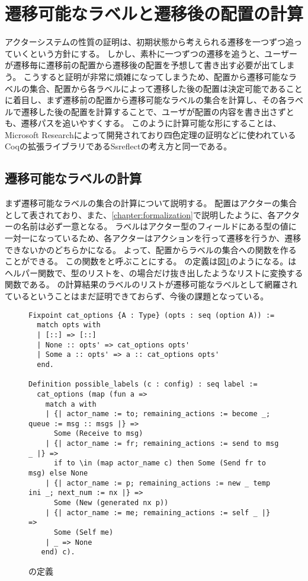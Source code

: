 \section{遷移可能なラベルと遷移後の配置の計算}

アクターシステムの性質の証明は、初期状態から考えられる遷移を一つずつ追っていくという方針にする。
しかし、素朴に一つずつの遷移を追うと、ユーザーが遷移毎に遷移前の配置から遷移後の配置を予想して書き出す必要が出てしまう。
こうすると証明が非常に煩雑になってしまうため、配置から遷移可能なラベルの集合、配置から各ラベルによって遷移した後の配置は決定可能であることに着目し、まず遷移前の配置から遷移可能なラベルの集合を計算し、その各ラベルで遷移した後の配置を計算することで、ユーザが配置の内容を書き出さずとも、遷移パスを追いやすくする。
このように計算可能な形にすることは、Microsoft Researchによって開発されており四色定理の証明などに使われているCoqの拡張ライブラリであるSsreflect\cite{ssreflect}の考え方と同一である。

\subsection{遷移可能なラベルの計算}

まず遷移可能なラベルの集合の計算について説明する。
配置はアクターの集合として表されており、また、\ref{chapter:formalization}で説明したように、各アクターの名前は必ず一意となる。
ラベルはアクター型のフィールドにある型の値に一対一になっているため、各アクターはアクションを行って遷移を行うか、遷移できないかのどちらかになる。
よって、配置からラベルの集合への関数を作ることができる。
この関数をと呼ぶことにする。
の定義は図\ref{code:proof:possible-labels}のようになる。はヘルパー関数で、型のリストを、の場合だけ抜き出したようなリストに変換する関数である。
の計算結果のラベルのリストが遷移可能なラベルとして網羅されているということはまだ証明できておらず、今後の課題となっている。


\begin{figure}
\begin{lstlisting}
Fixpoint cat_options {A : Type} (opts : seq (option A)) :=
  match opts with
  | [::] => [::]
  | None :: opts' => cat_options opts'
  | Some a :: opts' => a :: cat_options opts'
  end.

Definition possible_labels (c : config) : seq label :=
  cat_options (map (fun a =>
    match a with
    | {| actor_name := to; remaining_actions := become _; queue := msg :: msgs |} =>
      Some (Receive to msg)
    | {| actor_name := fr; remaining_actions := send to msg _ |} =>
      if to \in (map actor_name c) then Some (Send fr to msg) else None
    | {| actor_name := p; remaining_actions := new _ temp ini _; next_num := nx |} =>
      Some (New (generated nx p))
    | {| actor_name := me; remaining_actions := self _ |} =>
      Some (Self me)
    | _ => None
   end) c).
\end{lstlisting}
\label{code:proof:possible-labels}
\caption{の定義}
\end{figure}

